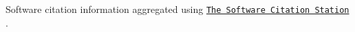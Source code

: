 \documentclass[linenumbers,trackchanges,twocolumn]{aastex7}
\begin{document}
Software citation information aggregated using \texttt{\href{https://www.tomwagg.com/software-citation-station/}{The Software Citation Station}} \citep{software-citation-station-paper, software-citation-station-zenodo}.




{}



\end{document}
